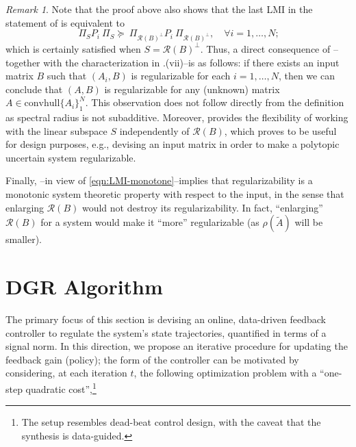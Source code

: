 \documentclass[journal]{IEEEtran}
\theoremstyle{definition}
\theoremstyle{remark}
\newtheorem{remark}{Remark}
\begin{document}
\begin{remark}
\color{Blue}
    Note that the proof above also shows that the last \ac{LMI} in the statement of  is equivalent to 
    \begin{equation}\label{eqn:LMI-monotone}
        ~\Pi_{S} P_i ~\Pi_{S} \succeq ~\Pi_{\mathcal{R}(B)^\perp} P_i ~\Pi_{\mathcal{R}(B)^\perp}, \quad \forall i=1,\dots, N;
    \end{equation}
    which is certainly satisfied when $S = \mathcal{R}(B)^\perp$.
    Thus, a direct consequence of --together with the characterization in .(vii)--is as follows: if there exists an input matrix $B$ such that $(A_i,B)$ is regularizable for each $i=1,\dots, N$, then we can conclude that $(A, B)$ is regularizable for any (unknown) matrix $A \in \mathrm{convhull}\{A_i\}_1^N$. 
    This observation does not follow directly from the definition as spectral radius is not subadditive.
    Moreover,  provides the flexibility of working with the linear subspace $S$ independently of $\mathcal{R}(B)$, which proves
    to be useful for design purposes, e.g., devising an input matrix in order to make a polytopic uncertain system regularizable.
\end{remark}
%
{\color{Blue}
Finally, --in view of \cref{eqn:LMI-monotone}--implies that 
regularizability is a monotonic system theoretic property
with respect to the input, in the sense that enlarging $\mathcal{R}(B)$ would
not destroy its regularizability. In fact, ``enlarging'' $\mathcal{R}(B)$ for a system would make it ``more'' regularizable (as $\rho(\widetilde{A})$ will be smaller).}

\section{\acf{DGR} Algorithm}
\label{sec:DGR}

The primary focus of this section is devising an online, data-driven feedback controller to regulate the system's state trajectories, quantified in terms
of a signal norm.
%
In this direction, we propose an iterative procedure for updating the feedback gain (policy);
the form of the controller can be motivated by considering, at each iteration $t$,
the following optimization problem with a ``one-step quadratic cost'',\footnote{The setup resembles dead-beat control design, with the caveat that the synthesis is data-guided.}
\end{document}
